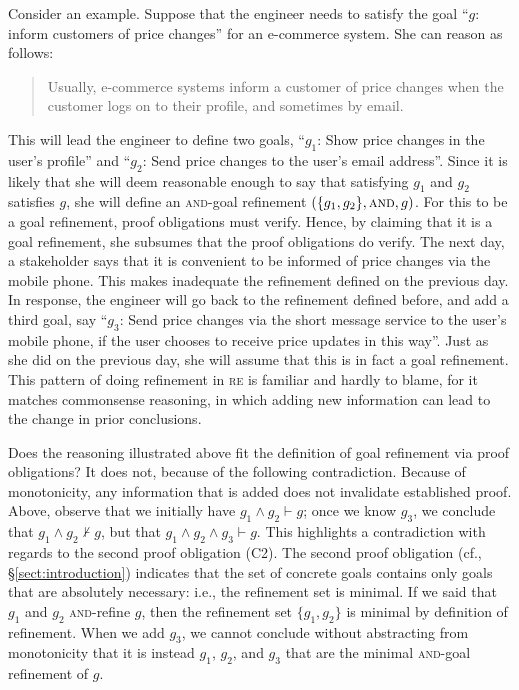\documentclass[10pt, conference, compsocconf]{IEEEtran}
\begin{document}
Consider an example. Suppose that the engineer needs to satisfy the goal ``$g$: inform customers of price changes'' for an e-commerce system. She can reason as follows:

\begin{quote}
	Usually, e-commerce systems inform a customer of price changes when the customer logs on to their profile, and sometimes by email. 
\end{quote}

This will lead the engineer to define two goals, ``$g_{1}$: Show price changes in the user's profile'' and ``$g_{2}$: Send price changes to the user's email address''. Since it is likely that she will deem reasonable enough to say that satisfying $g_{1}$ and $g_{2}$ satisfies $g$, she will define an \textsc{and}-goal refinement $(\{ g_{1}, g_{2} \}, \textsc{and}, g)$. For this to be a goal refinement, proof obligations must verify. Hence, by claiming that it is a goal refinement, she subsumes that the proof obligations do verify. The next day, a stakeholder says that it is convenient to be informed of price changes via the mobile phone. This makes inadequate the refinement defined on the previous day. In response, the engineer will go back to the refinement defined before, and add a third goal, say ``$g_{3}$: Send price changes via the short message service to the user's mobile phone, if the user chooses to receive price updates in this way''. Just as she did on the previous day, she will assume that this is in fact a goal refinement. This pattern of doing refinement in \textsc{re} is familiar and hardly to blame, for it matches commonsense reasoning, in which adding new information can lead to the change in prior conclusions.

Does the reasoning illustrated above fit the definition of goal refinement via proof obligations? It does not, because of the following contradiction. Because of monotonicity, any information that is added does not invalidate established proof. Above, observe that we initially have $g_{1} \wedge g_{2} \vdash g$; once we know $g_{3}$, we conclude that $g_{1} \wedge g_{2} \not\vdash g$, but that $g_{1} \wedge g_{2} \wedge g_{3} \vdash g$. This highlights a contradiction with regards to the second proof obligation (C2). The second proof obligation (cf., \S\ref{sect:introduction}) indicates that the set of concrete goals contains only goals that are absolutely necessary: i.e., the refinement set is minimal. If we said that $g_{1}$ and $g_{2}$ \textsc{and}-refine $g$, then the refinement set $\{ g_{1}, g_{2} \}$ is minimal by definition of refinement. When we add $g_{3}$, we cannot conclude without abstracting from monotonicity that it is instead $g_{1}$, $g_{2}$, and $g_{3}$ that are the minimal \textsc{and}-goal refinement of $g$.
\end{document}
